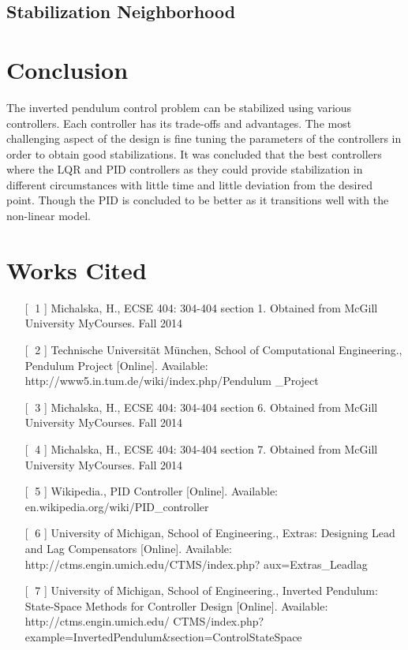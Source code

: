 \documentclass[12pt]{article} %
\begin{document}
\subsection{Stabilization Neighborhood} \label{sec:neigh}
\section{Conclusion}
The inverted pendulum control problem can be stabilized using various controllers. Each controller has its trade-offs and advantages. The most challenging aspect of the design is fine tuning the parameters of the controllers in order to obtain good stabilizations. It was concluded that the best controllers where the LQR and PID controllers as they could provide stabilization in different circumstances with little time and little deviation from the desired point. Though the PID is concluded to be better as it transitions well with the non-linear model.   
\newpage

\section{Works Cited}
\begin{itemize}
\item [[$\;$ 1]] Michalska, H., ECSE 404: 304-404 section 1. 
Obtained from McGill University MyCourses. Fall 2014
\item [[$\;$ 2]] Technische Universität München, School of Computational Engineering., Pendulum Project [Online]. Available: http://www5.in.tum.de/wiki/index.php/Pendulum \_Project
\item [[$\;$ 3]] Michalska, H., ECSE 404: 304-404 section 6. 
Obtained from McGill University MyCourses. Fall 2014
\item [[$\;$ 4]] Michalska, H., ECSE 404: 304-404 section 7. 
Obtained from McGill University MyCourses. Fall 2014
\item [[$\;$ 5]] Wikipedia., PID Controller [Online]. Available: 
en.wikipedia.org/wiki/PID\_controller
\item [[$\;$ 6]] University of Michigan, School of Engineering., Extras: Designing Lead and Lag Compensators [Online]. Available: http://ctms.engin.umich.edu/CTMS/index.php? aux=Extras\_Leadlag
\item [[$\;$ 7]]  University of Michigan, School of Engineering., Inverted Pendulum: State-Space Methods for Controller Design [Online]. Available: http://ctms.engin.umich.edu/ CTMS/index.php?example=InvertedPendulum\&section=ControlStateSpace
\end{itemize}
\end{document}
